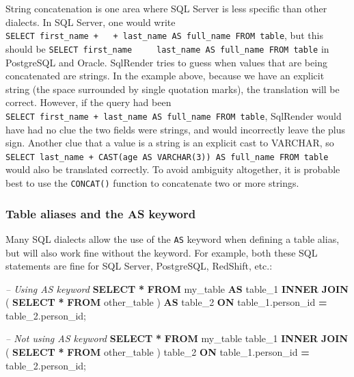 \documentclass[11pt]{book}
\newenvironment{Shaded}{\begin{snugshade}}{\end{snugshade}}
\newcommand{\CommentTok}[1]{\textcolor[rgb]{0.56,0.35,0.01}{\textit{#1}}}
\newcommand{\KeywordTok}[1]{\textcolor[rgb]{0.13,0.29,0.53}{\textbf{#1}}}
\newcommand{\NormalTok}[1]{#1}
\newcommand{\OperatorTok}[1]{\textcolor[rgb]{0.81,0.36,0.00}{\textbf{#1}}}
\theoremstyle{definition}
\theoremstyle{definition}
\theoremstyle{definition}
\theoremstyle{remark}
\begin{document}
String concatenation is one area where SQL Server is less specific than other dialects. In SQL Server, one would write \texttt{SELECT\ first\_name\ +\ \textquotesingle{}\ \textquotesingle{}\ +\ last\_name\ AS\ full\_name\ FROM\ table}, but this should be \texttt{SELECT\ first\_name\ \textbar{}\textbar{}\ \textquotesingle{}\ \textquotesingle{}\ \textbar{}\textbar{}\ last\_name\ AS\ full\_name\ FROM\ table} in PostgreSQL and Oracle. SqlRender tries to guess when values that are being concatenated are strings. In the example above, because we have an explicit string (the space surrounded by single quotation marks), the translation will be correct. However, if the query had been \texttt{SELECT\ first\_name\ +\ last\_name\ AS\ full\_name\ FROM\ table}, SqlRender would have had no clue the two fields were strings, and would incorrectly leave the plus sign. Another clue that a value is a string is an explicit cast to VARCHAR, so \texttt{SELECT\ last\_name\ +\ CAST(age\ AS\ VARCHAR(3))\ AS\ full\_name\ FROM\ table} would also be translated correctly. To avoid ambiguity altogether, it is probable best to use the \texttt{CONCAT()} function to concatenate two or more strings.

\hypertarget{table-aliases-and-the-as-keyword}{%
\subsubsection*{Table aliases and the AS keyword}\label{table-aliases-and-the-as-keyword}}

Many SQL dialects allow the use of the \texttt{AS} keyword when defining a table alias, but will also work fine without the keyword. For example, both these SQL statements are fine for SQL Server, PostgreSQL, RedShift, etc.:

\begin{Shaded}
\begin{Highlighting}[]
\CommentTok{-- Using AS keyword}
\KeywordTok{SELECT} \OperatorTok{*} 
\KeywordTok{FROM}\NormalTok{ my_table }\KeywordTok{AS}\NormalTok{ table_1}
\KeywordTok{INNER} \KeywordTok{JOIN}\NormalTok{ (}
  \KeywordTok{SELECT} \OperatorTok{*} \KeywordTok{FROM}\NormalTok{ other_table}
\NormalTok{) }\KeywordTok{AS}\NormalTok{ table_2}
\KeywordTok{ON}\NormalTok{ table_1.person_id }\OperatorTok{=}\NormalTok{ table_2.person_id;}

\CommentTok{-- Not using AS keyword}
\KeywordTok{SELECT} \OperatorTok{*} 
\KeywordTok{FROM}\NormalTok{ my_table table_1}
\KeywordTok{INNER} \KeywordTok{JOIN}\NormalTok{ (}
  \KeywordTok{SELECT} \OperatorTok{*} \KeywordTok{FROM}\NormalTok{ other_table}
\NormalTok{) table_2}
\KeywordTok{ON}\NormalTok{ table_1.person_id }\OperatorTok{=}\NormalTok{ table_2.person_id;}
\end{Highlighting}
\end{Shaded}
\end{document}
